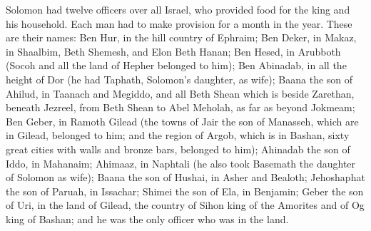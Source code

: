 \begin{paracol}{2}
\begin{otherlanguage}{english}
 Solomon had twelve officers over all Israel, who provided
food for the king and his household. Each man had to make provision for
a month in the year.  These are their names: Ben Hur, in
the hill country of Ephraim;  Ben Deker, in Makaz, in
Shaalbim, Beth Shemesh, and Elon Beth Hanan;  Ben Hesed,
in Arubboth (Socoh and all the land of Hepher belonged to him);
 Ben Abinadab, in all the height of Dor (he had Taphath,
Solomon's daughter, as wife);  Baana the son of Ahilud,
in Taanach and Megiddo, and all Beth Shean which is beside Zarethan,
beneath Jezreel, from Beth Shean to Abel Meholah, as far as beyond
Jokmeam;  Ben Geber, in Ramoth Gilead (the towns of Jair
the son of Manasseh, which are in Gilead, belonged to him; and the
region of Argob, which is in Bashan, sixty great cities with walls and
bronze bars, belonged to him);  Ahinadab the son of Iddo,
in Mahanaim;  Ahimaaz, in Naphtali (he also took Basemath
the daughter of Solomon as wife);  Baana the son of
Hushai, in Asher and Bealoth;  Jehoshaphat the son of
Paruah, in Issachar;  Shimei the son of Ela, in Benjamin;
 Geber the son of Uri, in the land of Gilead, the country
of Sihon king of the Amorites and of Og king of Bashan; and he was the
only officer who was in the land.


\end{otherlanguage}
\end{paracol}
